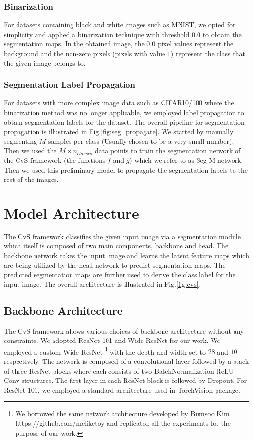 \documentclass[conference]{IEEEtran}
\begin{document}
\subsubsection{Binarization}
For datasets containing black and white images such as MNIST, we opted for simplicity and applied a binarization technique with threshold $0.0$ to obtain the segmentation maps. In the obtained image, the $0.0$ pixel values represent the background and the non-zero pixels (pixels with value $1$) represent the class that the given image belongs to. 

\subsubsection{Segmentation Label Propagation}
For datasets with more complex image data such as CIFAR10/100 where the binarization method was no longer applicable, we employed label propagation to obtain segmentation labels for the dataset. The overall pipeline for segmentation propagation is illustrated in Fig.\ref{fig:seg_propagate}. We started by manually segmenting $M$ samples per class (Usually chosen to be a very small number). Then we used the $M\times n_{classes}$ data points to train the segmentation network of the CvS framework (the functions $f$ and $g$) which we refer to as Seg-M network. Then we used this preliminary model to propagate the segmentation labels to the rest of the images.   

\section{Model Architecture}
The CvS framework classifies the given input image via a segmentation module which itself is composed of two main components, backbone and head. The backbone network takes the input image and learns the latent feature maps which are being utilized by the head network to predict segmentation maps. The predicted segmentation maps are further used to derive the class label for the input image. The overall architecture is illustrated in Fig.\ref{fig:cvs}. 

\subsection{Backbone Architecture}
The CvS framework allows various choices of backbone architecture without any constraints. We adopted ResNet-101 and Wide-ResNet for our work. We employed a custom Wide-ResNet \footnote{We borrowed the same network architecture developed by Bumsoo Kim https://github.com/meliketoy and replicated all the experiments for the purpose of our work.} with the depth and width set to $28$ and $10$ respectively. The network is composed of a convolutional layer followed by a stack of three ResNet blocks where each consists of two BatchNormalization-ReLU-Conv structures. The first layer in each ResNet block is followed by Dropout. For ResNet-101, we employed a standard architecture used in TorchVision package.
\end{document}
